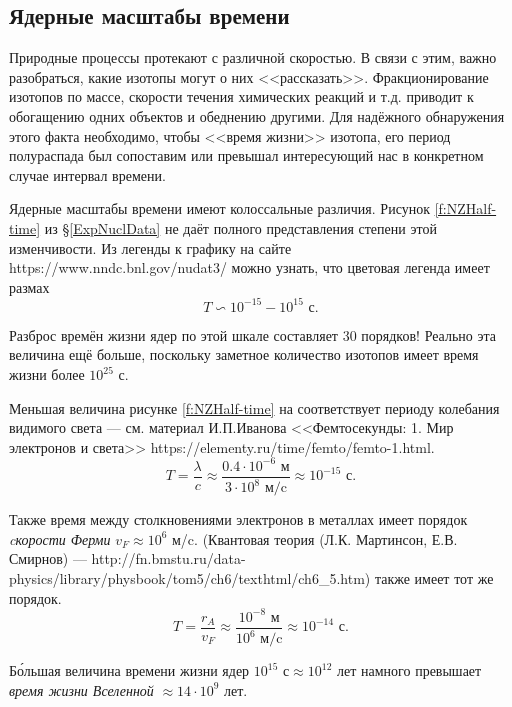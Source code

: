 \documentclass[a5paper,openany]{book}
\begin{document}
	
	\subsection{Ядерные масштабы времени} \label{NuclearTimeScales}

	Природные процессы протекают с различной скоростью. В связи с этим, важно разобраться, какие изотопы могут о них <<рассказать>>.  Фракционирование изотопов по массе, скорости течения химических реакций и т.д. приводит к обогащению одних объектов и обеднению другими. Для надёжного обнаружения этого факта необходимо, чтобы <<время жизни>> изотопа, его период полураспада был сопоставим или превышал интересующий нас в конкретном случае интервал времени.
	
	Ядерные масштабы времени имеют колоссальные различия. Рисунок \ref{f:NZHalf-time} из \S\ref{ExpNuclData} не даёт полного представления степени этой изменчивости. Из легенды к графику на сайте https://www.nndc.bnl.gov/nudat3/ можно узнать, что цветовая легенда имеет размах
		\begin{equation} \label{NuclTimeScale}
		T \backsim 10^{-15} - 10^{15}   \text{ с}.
	\end{equation}

	Разброс времён жизни ядер по этой шкале составляет 30 порядков! Реально эта величина ещё больше, поскольку заметное количество изотопов имеет время жизни более $10^{25}$ с.
	
	Меньшая величина рисунке \ref{f:NZHalf-time} на соответствует периоду колебания видимого света --- см. материал И.П.Иванова <<Фемтосекунды: 1. Мир электронов и света>> https://elementy.ru/time/femto/femto-1.html. 
	\begin{equation} \label{NuclTimeMin}
		T = \frac{\lambda}{c}\approx \frac{0.4 \cdot 10^{-6} \text{ м}}{3 \cdot 10^{8} \text{ м/c} } \approx 10^{-15} \text{ с}.
	\end{equation}
	
	Также время между столкновениями электронов в металлах имеет порядок \emph{cкорости Ферми} $v_F \approx 10^6$ м/c. 
	(Квантовая теория (Л.К. Мартинсон, Е.В. Смирнов) --- http://fn.bmstu.ru/data-physics/library/physbook/tom5/ch6/texthtml/ch6\_5.htm) также имеет тот же порядок.
		\begin{equation} \label{NuclTimeMax}
		T = \frac{r_A}{v_F}\approx \frac{10^{-8} \text{ м}}{10^{6} \text{ м/c} } \approx 10^{-14} \text{ с}.
	\end{equation}
	
	Б\'{о}льшая величина времени жизни ядер $10^{15} \text{ с} \approx 10^{12} \text{ лет}$  намного превышает \emph{время жизни Вселенной} $\approx 14 \cdot 10^{9} \text{ лет}$.  
	
\end{document}
